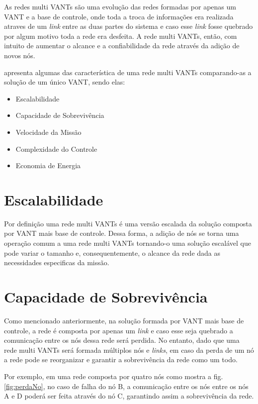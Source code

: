 As redes multi VANTs são uma evolução das redes formadas por apenas um VANT e a base de controle, onde toda a troca de informações era realizada atraves de um \emph{link} entre as duas partes do sistema e caso esse \emph{link} fosse quebrado por algum motivo toda a rede era desfeita. A rede multi VANTs, então, com intuito de aumentar o alcance e a confiabilidade da rede através da adição de novos nós.

\cite{gupta2015survey} apresenta algumas das característica de uma rede multi VANTs comparando-as a solução de um único VANT, sendo elas:
\begin{itemize}
\item Escalabilidade
\item Capacidade de Sobrevivência
\item Velocidade da Missão
\item Complexidade do Controle
\item Economia de Energia
\end{itemize} 

\section{Escalabilidade}

Por definição uma rede multi VANTs é uma versão escalada da solução composta por VANT mais base de controle. Dessa forma, a adição de nós se torna uma operação comum a uma rede multi VANTs tornando-o uma solução escalável que pode variar o tamanho e, consequentemente, o alcance da rede dada as necessidades especificas da missão.

\section{Capacidade de Sobrevivência}

Como mencionado anteriormente, na solução formada por VANT mais base de controle, a rede é composta por apenas um \emph{link} e caso esse seja quebrado a comunicação entre os nós dessa rede será perdida. No entanto, dado que uma rede multi VANTs será formada múltiplos nós e \emph{links}, em caso da perda de um nó a rede pode se reorganizar e garantir a sobrevivência da rede como um todo. 

Por exemplo, em uma rede composta por quatro nós como mostra a fig. \ref{fig:perdaNo}, no caso de falha do nó B, a comunicação entre os nós entre os nós A e D poderá ser feita através do nó C, garantindo assim a sobrevivência da rede. 

